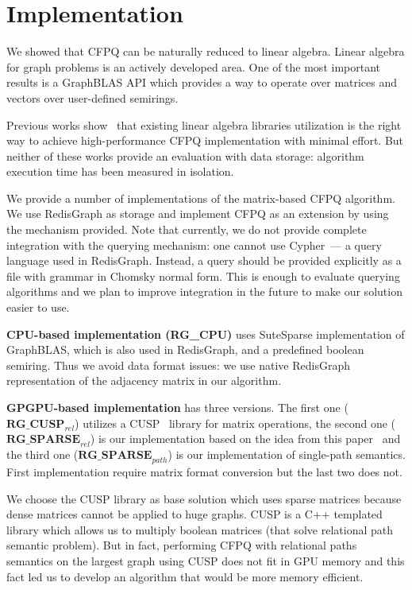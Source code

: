 \section{Implementation}

We showed that CFPQ can be naturally reduced to linear algebra.
Linear algebra for graph problems is an actively developed area.
One of the most important results is a GraphBLAS API which provides a way to operate over matrices and vectors over user-defined semirings.

Previous works show~\cite{Mishin:2019:ECP:3327964.3328503, Azimov:2018:CPQ:3210259.3210264} that existing linear algebra libraries utilization is the right way to achieve high-performance CFPQ implementation with minimal effort.
But neither of these works provide an evaluation with data storage: algorithm execution time has been measured in isolation.

We provide a number of implementations of the matrix-based CFPQ algorithm.
We use RedisGraph as storage and implement CFPQ as an extension by using the mechanism provided.
Note that currently, we do not provide complete integration with the querying mechanism: one cannot use Cypher~--- a query language used in RedisGraph.
Instead, a query should be provided explicitly as a file with grammar in Chomsky normal form.
This is enough to evaluate querying algorithms and we plan to improve integration in the future to make our solution easier to use. 

\textbf{CPU-based implementation (RG\_CPU)} uses SuteSparse implementation of GraphBLAS, which is also used in RedisGraph, and a predefined boolean semiring.
Thus we avoid data format issues: we use native RedisGraph representation of the adjacency matrix in our algorithm.

\textbf{GPGPU-based implementation} has three versions.
The first one ($\textbf{RG\_CUSP}_{rel}$) utilizes a CUSP~\cite{Cusp} library for matrix operations, the second one ($\textbf{RG\_SPARSE}_{rel}$) is our implementation based on the idea from this paper~\cite{NsparsePaper} and the third one ($\textbf{RG\_SPARSE}_{path}$) is our implementation of single-path semantics.
First implementation require matrix format conversion but the last two does not.

We choose the CUSP library as base solution which uses sparse matrices because dense matrices cannot be applied to huge graphs. CUSP is a C++ templated library which allows us to multiply boolean matrices (that solve relational path semantic problem). But in fact, performing CFPQ with relational paths semantics on the largest graph using CUSP does not fit in GPU memory and this fact led us to develop an algorithm that would be more memory efficient.


